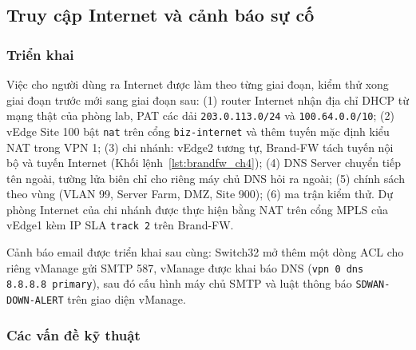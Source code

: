 \subsection{Truy cập Internet và cảnh báo sự cố}

\subsubsection{Triển khai}

Việc cho người dùng ra Internet được làm theo từng giai đoạn, kiểm thử xong giai đoạn trước mới sang giai đoạn sau: (1) router Internet nhận địa chỉ DHCP từ mạng thật của phòng lab, PAT các dải \texttt{203.0.113.0/24} và \texttt{100.64.0.0/10}; (2) vEdge Site 100 bật \texttt{nat} trên cổng \texttt{biz-internet} và thêm tuyến mặc định kiểu NAT trong VPN 1; (3) chi nhánh: vEdge2 tương tự, Brand-FW tách tuyến nội bộ và tuyến Internet (Khối lệnh~\ref{lst:brandfw_ch4}); (4) DNS Server chuyển tiếp tên ngoài, tường lửa biên chỉ cho riêng máy chủ DNS hỏi ra ngoài; (5) chính sách theo vùng (VLAN 99, Server Farm, DMZ, Site 900); (6) ma trận kiểm thử. Dự phòng Internet của chi nhánh được thực hiện bằng NAT trên cổng MPLS của vEdge1 kèm IP SLA \texttt{track 2} trên Brand-FW.

Cảnh báo email được triển khai sau cùng: Switch32 mở thêm một dòng ACL cho riêng vManage gửi SMTP 587, vManage được khai báo DNS (\texttt{vpn 0 dns 8.8.8.8 primary}), sau đó cấu hình máy chủ SMTP và luật thông báo \texttt{SDWAN-DOWN-ALERT} trên giao diện vManage.

\subsubsection{Các vấn đề kỹ thuật}\label{sec:bai_hoc_internet}

